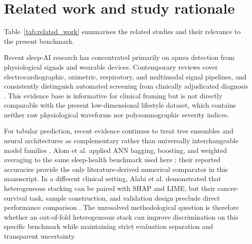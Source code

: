 \documentclass[a4paper,fleqn]{cas-dc}
\begin{document}
\section{Related work and study rationale}
Table~\ref{tab:related_work} summarises the related studies and their relevance to the present benchmark.

Recent sleep-AI research has concentrated primarily on apnea detection from physiological signals and wearable devices. Contemporary reviews cover electrocardiographic, oximetric, respiratory, and multimodal signal pipelines, and consistently distinguish automated screening from clinically adjudicated diagnosis \cite{bazoukis2023,tyagi2023,abdalrazaq2024,giorgi2025}. This evidence base is informative for clinical framing but is not directly comparable with the present low-dimensional lifestyle dataset, which contains neither raw physiological waveforms nor polysomnographic severity indices.

For tabular prediction, recent evidence continues to treat tree ensembles and neural architectures as complementary rather than universally interchangeable model families \cite{borisov2024}. Alom et al. applied ANN bagging, boosting, and weighted averaging to the same sleep-health benchmark used here \cite{alom2024}; their reported accuracies provide the only literature-derived numerical comparator in this manuscript. In a different clinical setting, Alabi et al. demonstrated that heterogeneous stacking can be paired with SHAP and LIME, but their cancer-survival task, sample construction, and validation design preclude direct performance comparison \cite{alabi2023}. The unresolved methodological question is therefore whether an out-of-fold heterogeneous stack can improve discrimination on this specific benchmark while maintaining strict evaluation separation and transparent uncertainty.
\end{document}
